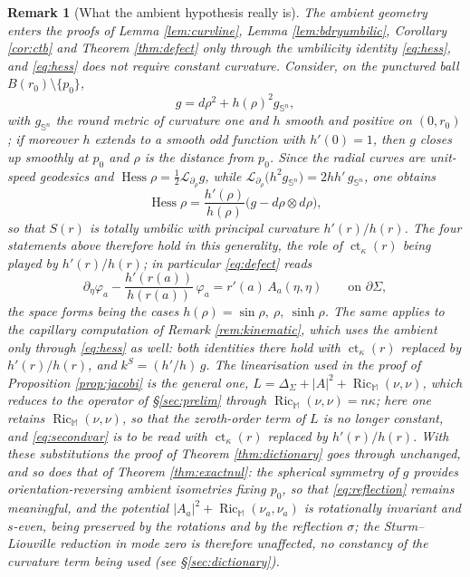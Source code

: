 \documentclass[10pt,a4paper]{amsart}
\newtheorem{remark}[theorem]{Remark}
\newcommand{\M}{\mathbb{M}}
\newcommand{\Sph}{\mathbb{S}}
\newcommand{\ct}{\operatorname{ct}_\kappa}
\newcommand{\Hess}{\operatorname{Hess}}
\newcommand{\Ric}{\operatorname{Ric}}
\begin{document}
\begin{remark}[What the ambient hypothesis really is]\label{rem:warped}
The ambient geometry enters the proofs of Lemma  \ref{lem:curvline}, Lemma  \ref{lem:bdryumbilic}, Corollary  \ref{cor:ctb} and Theorem  \ref{thm:defect} only through the umbilicity identity \eqref{eq:hess}, and \eqref{eq:hess} does not require constant curvature. Consider, on the punctured ball $B(r_0)\setminus\{p_0\}$,
\[
g=d\rho^{2}+h(\rho)^{2}g_{\Sph^{n}} ,
\]
with $g_{\Sph^n}$ the round metric of curvature one and $h$ smooth and positive on $(0,r_0)$; if moreover $h$ extends to a smooth odd function with $h'(0)=1$, then $g$ closes up smoothly at $p_0$ and $\rho$ is the distance from $p_0$.
Since the radial curves are unit-speed geodesics and
$\Hess\rho=\tfrac12\mathcal L_{\partial_\rho}g$, while
$\mathcal L_{\partial_\rho}\bigl(h^{2}g_{\Sph^{n}}\bigr)=2hh'\,g_{\Sph^{n}}$,
one obtains
\[
\Hess\rho=\frac{h'(\rho)}{h(\rho)}\bigl(g-d\rho\otimes d\rho\bigr),
\]
so that $S(r)$ is totally umbilic with principal curvature $h'(r)/h(r)$. The four statements above therefore hold in this generality, the role of $\ct(r)$ being played by $h'(r)/h(r)$; in particular \eqref{eq:defect} reads
\[
\partial_\eta\varphi_a-\frac{h'(r(a))}{h(r(a))}\,\varphi_a
=r'(a)\,A_a(\eta,\eta)\qquad\text{on }\partial\Sigma ,
\]
the space forms being the cases $h(\rho)=\sin\rho,\ \rho,\ \sinh\rho$. The same applies to the capillary computation of Remark \ref{rem:kinematic}, which uses the ambient only through \eqref{eq:hess} as well: both identities there hold with $\ct(r)$ replaced by $h'(r)/h(r)$, and $k^{S}=(h'/h)\,g$. The linearisation used in the proof of Proposition  \ref{prop:jacobi} is the general one, $L=\Delta_\Sigma+|A|^{2}+\Ric_{\M}(\nu,\nu)$, which reduces to the operator of \S\ref{sec:prelim} through $\Ric_{\M}(\nu,\nu)=n\kappa$; here one retains $\Ric_{\M}(\nu,\nu)$, so that the zeroth-order term of $L$ is no longer constant, and \eqref{eq:secondvar} is to be read with $\ct(r)$ replaced by $h'(r)/h(r)$. With these substitutions the proof of Theorem  \ref{thm:dictionary} goes through unchanged, and so does that of Theorem \ref{thm:exactnul}: the spherical symmetry of $g$ provides orientation-reversing ambient isometries fixing $p_0$, so that \eqref{eq:reflection} remains meaningful, and the potential $|A_a|^{2}+\Ric_{\M}(\nu_a,\nu_a)$ is rotationally invariant and $s$-even, being
preserved by the rotations and by the reflection $\sigma$; the Sturm--Liouville reduction in mode zero is therefore unaffected, no constancy of the curvature term being used (see \S\ref{sec:dictionary}).


\end{remark}
\end{document}
